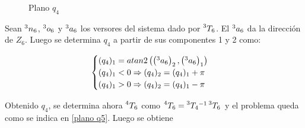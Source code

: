 \documentclass[a4paper,12pt]{article}
\begin{document}
\begin{figure}[H]
    \centering
    \begin{adjustbox}{max width=\columnwidth}
    \end{adjustbox}
    \caption{Plano $q_{4}$}
    \label{plano q4}
\end{figure}

Sean $\prescript{3}{}{n_6}$, $\prescript{3}{}{o_6}$ y $\prescript{3}{}{a_6}$ los 
versores del sistema dado por $\prescript{3}{}{T_6}$. El $\prescript{3}{}{a_6}$ da la dirección de $Z_6$. Luego se determina
$q_4$ a partir de sus componentes 1 y 2 como:

\begin{align}
    \begin{cases}
        (q_4)_1 = atan2\left(\left(\prescript{3}{}{a_6}\right)_2, \left(\prescript{3}{}{a_6}\right)_1\right)\\
        (q_4)_1 < 0 \Rightarrow (q_4)_2 = (q_4)_1 + \pi\\
        (q_4)_1 > 0 \Rightarrow (q_4)_2 = (q_4)_1 - \pi\\
    \end{cases}
    \label{q4}
\end{align}

Obtenido $q_4$, se determina ahora $\prescript{4}{}{T_6}$ como $\prescript{4}{}{T_6} = \prescript{3}{}{T_4}^{-1}\prescript{3}{}{T_6}$ y el problema
queda como se indica en \cref{plano q5}. Luego se obtiene 
\end{document}
